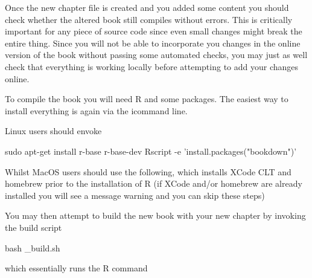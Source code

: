 \documentclass[]{book}
\newenvironment{Shaded}{\begin{snugshade}}{\end{snugshade}}
\newcommand{\StringTok}[1]{\textcolor[rgb]{0.31,0.60,0.02}{#1}}
\newcommand{\FunctionTok}[1]{\textcolor[rgb]{0.00,0.00,0.00}{#1}}
\newcommand{\VariableTok}[1]{\textcolor[rgb]{0.00,0.00,0.00}{#1}}
\newcommand{\ExtensionTok}[1]{#1}
\newcommand{\NormalTok}[1]{#1}
\begin{document}
Once the new chapter file is created and you added some content you
should check whether the altered book still compiles without errors.
This is critically important for any piece of source code since even
small changes might break the entire thing. Since you will not be able
to incorporate you changes in the online version of the book without
passing some automated checks, you may just as well check that
everything is working locally before attempting to add your changes
online.

To compile the book you will need R and some packages. The easiest way
to install everything is again via the icommand line.

Linux users should envoke

\begin{Shaded}
\begin{Highlighting}[]
\FunctionTok{sudo}\NormalTok{ apt-get install r-base r-base-dev }
\ExtensionTok{Rscript}\NormalTok{ -e }\StringTok{'install.packages("bookdown")'}
\end{Highlighting}
\end{Shaded}

Whilst MacOS users should use the following, which installs XCode CLT
and homebrew prior to the installation of R (if XCode and/or homebrew
are already installed you will see a message warning and you can skip
these steps)

\begin{Shaded}
\end{Shaded}

You may then attempt to build the new book with your new chapter by
invoking the build script

\begin{Shaded}
\begin{Highlighting}[]
\FunctionTok{bash}\NormalTok{ _build.sh}
\end{Highlighting}
\end{Shaded}

which essentially runs the R command
\end{document}
